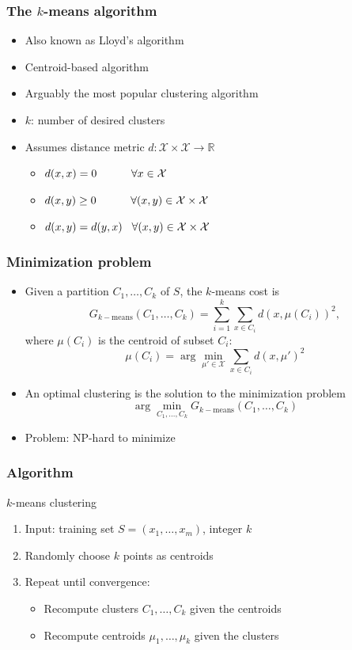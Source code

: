 \documentclass[10pt]{beamer}
\begin{document}
\begin{frame}
  \frametitle{The $k$-means algorithm}
  \begin{itemize}
    \item Also known as Lloyd's algorithm
    \item Centroid-based algorithm
	\item Arguably the most popular clustering algorithm
	\item $k$: number of desired clusters
	\item Assumes {\color{red} distance metric} $d:\mathcal{X}\times\mathcal{X}\rightarrow\mathbb{R}$
	\begin{itemize}
	\item $d(x,x) = 0 \hspace*{1.1cm} \forall x\in\mathcal{X}$
	\item $d(x,y) \geq 0 \hspace*{1.1cm} \forall (x,y) \in \mathcal{X} \times \mathcal{X}$
	\item $d(x,y) = d(y,x) \hspace*{.3cm} \forall (x,y) \in \mathcal{X} \times \mathcal{X}$
	\end{itemize}
  \end{itemize}
\end{frame}

\begin{frame}
  \frametitle{Minimization problem}
  \begin{itemize}
	\item Given a {\color{red} partition} $C_1,\ldots,C_k$ of $S$, the $k$-means cost is
	\[G_{k-\text{means}}(C_1,\ldots,C_k) = \sum_{i=1}^k\sum_{x\in C_i} d(x,\mu(C_i))^2,\]
	where $\mu(C_i)$ is the {\color{blue} centroid} of subset $C_i$:
	\[\mu(C_i) = \arg\min_{\mu'\in\mathcal{X}} \sum_{x\in C_i} d(x,\mu')^2\]
	\item An optimal clustering is the solution to the minimization problem
	\[\arg\min_{C_1,\ldots,C_k} G_{k-\text{means}}(C_1,\ldots,C_k)\]
	\item {\color{red} Problem}: NP-hard to minimize
  \end{itemize}
\end{frame}

\begin{frame}
  \frametitle{Algorithm}
  \begin{block}{$k$-means clustering}
  \begin{enumerate}
    \item Input: training set $S=(x_1,\ldots,x_m)$, integer $k$
	\item Randomly choose $k$ points as centroids
	\item Repeat until convergence:
  \begin{itemize}
    \item Recompute clusters $C_1,\ldots,C_k$ given the centroids
	\item Recompute centroids $\mu_1,\ldots,\mu_k$ given the clusters
  \end{itemize}
  \end{enumerate}
  \end{block}
\end{frame}
\end{document}
